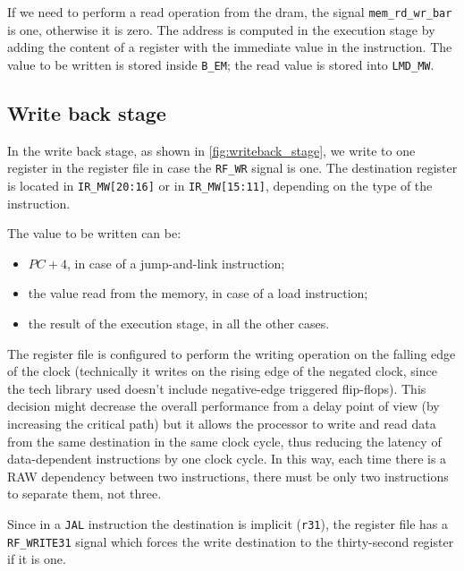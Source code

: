 If we need to perform a read operation from the dram, the signal \texttt{mem\_rd\_wr\_bar} is one, otherwise it is zero.
The address is computed in the execution stage by adding the content of a register with the immediate value in the instruction. 
The value to be written is stored inside \texttt{B\_EM}; the read value is stored into \texttt{LMD\_MW}. 

\subsection{Write back stage}

In the write back stage, as shown in \autoref{fig:writeback_stage}, we write to one register in the register file in case the \texttt{RF\_WR} signal is one. 
The destination register is located in \texttt{IR\_MW[20:16]} or in \texttt{IR\_MW[15:11]}, depending on the type of the instruction.

The value to be written can be:
\begin{itemize}
    \item $PC + 4$, in case of a jump-and-link instruction;
    \item the value read from the memory, in case of a load instruction;
    \item the result of the execution stage, in all the other cases.
\end{itemize}

The register file is configured to perform the writing operation on the falling edge of the clock (technically it writes on the rising edge of the negated clock, since the tech library used doesn't include negative-edge triggered flip-flops). 
This decision might decrease the overall performance from a delay point of view (by increasing the critical path) but it allows the processor to write and read data from the same destination in the same clock cycle, thus reducing the latency of data-dependent instructions by one clock cycle.
In this way, each time there is a RAW dependency between two instructions, there must be only two instructions to separate them, not three. 

Since in a \texttt{JAL} instruction the destination is implicit (\texttt{r31}), the register file has a \texttt{RF\_WRITE31} signal which forces the write destination to the thirty-second register if it is one.


